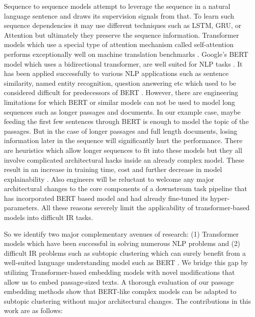 Sequence to sequence models attempt to leverage the sequence in a natural language sentence and draws its supervision signals from that. To learn such sequence dependencies it may use different techniques such as LSTM, GRU, or Attention  but ultimately they preserve the sequence information. Transformer models which use a special type of attention mechanism called self-attention performs exceptionally well on machine translation benchmarks . Google's BERT model which uses a bidirectional transformer, are well suited for NLP tasks . It has been applied successfully to various NLP applications such as sentence similarity, named entity recognition, question answering etc which used to be considered difficult for predecessors of BERT . However, there are engineering limitations for which BERT or similar models can not be used to model long sequences such as longer passages and documents. In our example case, maybe feeding  the first few sentences through BERT is enough to model the topic of the passages. But in the case of longer passages and full length documents, losing information later in the sequence will significantly hurt the performance. There are heuristics which allow longer sequences to fit into these models but they all involve complicated architectural hacks  inside an already complex model. These result in an increase in training time, cost and further decrease in model explainability .  Also engineers will be reluctant to welcome any major architectural changes to the core components of a downstream task pipeline that has incorporated BERT based model and had already fine-tuned its hyper-parameters. All these reasons severely limit the applicability of transformer-based models into difficult IR tasks.

So we identify two major complementary avenues of research:  (1) Transformer models which have been successful in solving numerous NLP problems and (2) difficult IR problems such as subtopic clustering which can surely benefit from a well-suited language understanding model such as BERT . We bridge this gap  by utilizing Transformer-based embedding models with novel  modifications that allow us to embed passage-sized texts. A thorough evaluation of our passage embedding methods show that BERT-like complex models can be adapted to  subtopic clustering without major architectural changes. The contributions in this work are as follows:

